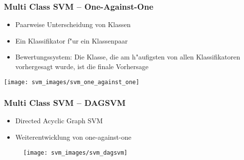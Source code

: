 \begin{frame}

\frametitle{Multi Class SVM -- One-Against-One}

\begin{itemize}
	\setlength{\itemsep}{7pt}
	\item Paarweise Unterscheidung von Klassen
	\item Ein Klassifikator f"ur ein Klassenpaar
	\item Bewertungssystem: Die Klasse, die am h"aufigsten von allen Klassifikatoren vorhergesagt wurde, ist die finale Vorhersage
\end{itemize}

\center

\texttt{[image: svm\_images/svm\_one\_against\_one]}


\end{frame}








\begin{frame}

\frametitle{Multi Class SVM --  DAGSVM}

\begin{itemize}
	\setlength{\itemsep}{5pt}
	\item Directed Acyclic Graph SVM
	\item Weiterentwicklung von one-against-one
\end{itemize}

\begin{figure}[h]
\centering
\texttt{[image: svm\_images/svm\_dagsvm]}
\end{figure}

\end{frame}











